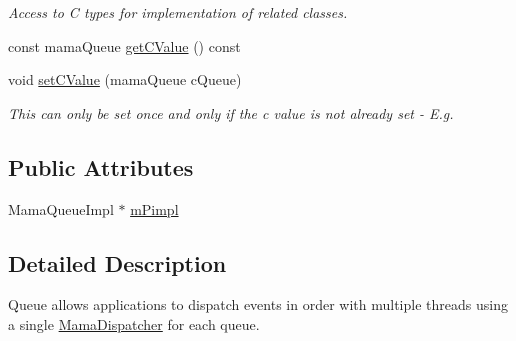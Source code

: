\begin{DoxyCompactItemize}
\begin{DoxyCompactList}\small\item\em Access to C types for implementation of related classes. \item\end{DoxyCompactList}\item 
const mamaQueue \hyperlink{classWombat_1_1MamaQueue_a54a801b112d64a8c8d4a56727a9e799a}{getCValue} () const 
\item 
void \hyperlink{classWombat_1_1MamaQueue_ab43f6f93c109d66a287f1d45e6a8b284}{setCValue} (mamaQueue cQueue)
\begin{DoxyCompactList}\small\item\em This can only be set once and only if the c value is not already set -\/ E.g. \item\end{DoxyCompactList}\end{DoxyCompactItemize}
\subsection*{Public Attributes}
\begin{DoxyCompactItemize}
\item 
MamaQueueImpl $\ast$ \hyperlink{classWombat_1_1MamaQueue_aea38f0077fd452cbb07197e2017b267c}{mPimpl}
\end{DoxyCompactItemize}


\subsection{Detailed Description}
Queue allows applications to dispatch events in order with multiple threads using a single \hyperlink{classWombat_1_1MamaDispatcher}{MamaDispatcher} for each queue. 


